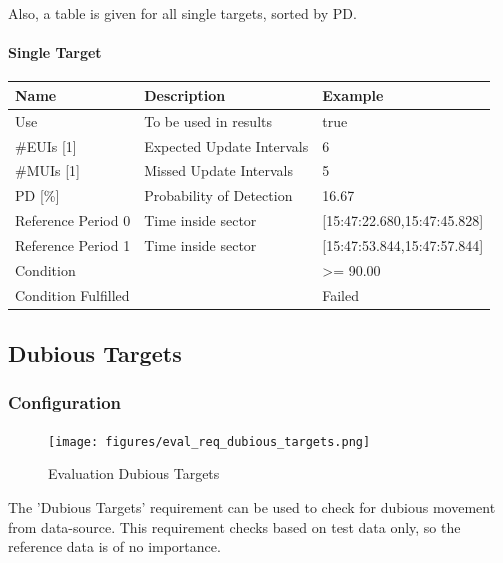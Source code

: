 Also, a table is given for all single targets, sorted by PD.

\paragraph{Single Target}

\begin{center}
 \begin{table}[H]
  \begin{tabularx}{\textwidth}{ | l | X |  l | }
    \hline
    \textbf{Name} & \textbf{Description} & \textbf{Example} \\ \hline
    Use & To be used in results & true \\ \hline
    \#EUIs [1] & Expected Update Intervals & 6 \\ \hline
    \#MUIs [1] & Missed Update Intervals & 5 \\ \hline
    PD [\%] & Probability of Detection & 16.67 \\ \hline
    Reference Period 0 & Time inside sector & [15:47:22.680,15:47:45.828] \\ \hline
    Reference Period 1 & Time inside sector & [15:47:53.844,15:47:57.844] \\ \hline
    Condition &  & >= 90.00 \\ \hline
    Condition Fulfilled &  & Failed \\ \hline
\end{tabularx}
\end{table}
\end{center}


\subsection{Dubious Targets}
\label{sec:eval_req_dubious_targets} 

\subsubsection{Configuration}

\begin{figure}[H]
    \texttt{[image: figures/eval\_req\_dubious\_targets.png]}
   \caption{Evaluation Dubious Targets}
\end{figure}

The 'Dubious Targets' requirement can be used to check for dubious movement from data-source. This requirement checks based on test data only, so the reference data is of no importance. \\

